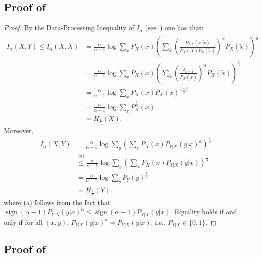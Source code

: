 \documentclass{article}
\numberwithin{theorem}{section}
\numberwithin{example}{section}
\numberwithin{remark}{section}
\numberwithin{definition}{section}
\DeclareMathOperator{\sign}{sign}
\begin{document}
\subsection{Proof of~}\label{app:proof:boundsviaRenyi}
\begin{proof}
    By the Data-Processing Inequality of $I_\alpha$ (see~) one has that:
    \begin{align}
        I_\alpha(X,Y) \leq I_\alpha(X,X) &= \frac{\alpha}{\alpha-1}\log\sum_{x}P_X(x)\left(\sum_{\tilde{x}}\left(\frac{P_{XX}(x,\tilde{x})}{P_X(X)P_X(\tilde{x})}\right)^\alpha P_X(\tilde{x})\right)^\frac1\alpha\\
        &= \frac{\alpha}{\alpha-1}\log\sum_{x}P_X(x)\left(\sum_{\tilde{x}}\left(\frac{\delta_{x=\hat{x}}}{P_X(\tilde{x})}\right)^\alpha P_X(\tilde{x})\right)^\frac1\alpha \\
        &= \frac{\alpha}{\alpha-1}\log\sum_{x}P_X(x) P_X(x)^{\frac{1-\alpha}{\alpha}}\\
        &= \frac{\alpha}{\alpha-1}\log\sum_{x}P_X^\frac1\alpha(x) \\
        &= H_{\frac1\alpha}(X). 
    \end{align}
Moreover,
\begin{align}
    I_\alpha(X,Y) & = \frac{\alpha}{\alpha-1} \log \sum_y \left( \sum_x P_X(x) P_{Y|X}(y|x)^\alpha \right)^{\frac{1}{\alpha}} \\
    & \stackrel{\text{(a)}} \leq \frac{\alpha}{\alpha-1} \log \sum_y \left( \sum_x P_X(x) P_{Y|X}(y|x) \right)^{\frac{1}{\alpha}} \\
    & =  \frac{\alpha}{\alpha-1} \log \sum_y P_{Y}(y)^{\frac{1}{\alpha}} \\
    & = H_{\frac{1}{\alpha}} (Y).
\end{align}
    where (a) follows from the fact that $\sign(\alpha-1) P_{Y|X}(y|x)^{\alpha} \leq \sign(\alpha-1) P_{Y|X}(y|x)$. Equality holds if and only if for all $(x,y)$, $P_{Y|X}(y|x)^\alpha = P_{Y|X}(y|x)$, i.e., $P_{Y|X} \in 
    \{0,1\}$.
\end{proof}


\subsection{Proof of~}\label{app:proof:thm:properties-alpha}
\end{document}
